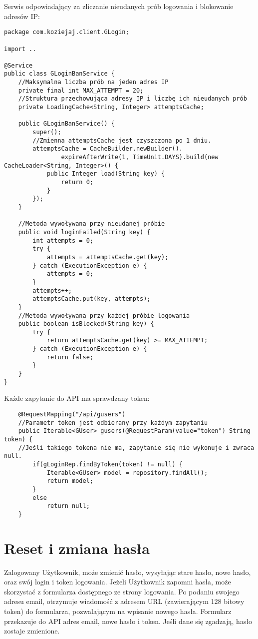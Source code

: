 \documentclass[a4paper,12pt,twoside,openany]{report}
\begin{document}
Serwis odpowiadający za zliczanie nieudanych prób logowania i blokowanie adresów IP:
\begin{lstlisting}
package com.koziejaj.client.GLogin;

import ..

@Service
public class GLoginBanService {
	//Maksymalna liczba prób na jeden adres IP
    private final int MAX_ATTEMPT = 20;
    //Struktura przechowująca adresy IP i liczbę ich nieudanych prób
    private LoadingCache<String, Integer> attemptsCache;

    public GLoginBanService() {
        super();
        //Zmienna attemptsCache jest czyszczona po 1 dniu.
        attemptsCache = CacheBuilder.newBuilder().
                expireAfterWrite(1, TimeUnit.DAYS).build(new CacheLoader<String, Integer>() {
            public Integer load(String key) {
                return 0;
            }
        });
    }
    
	//Metoda wywoływana przy nieudanej próbie
    public void loginFailed(String key) {
        int attempts = 0;
        try {
            attempts = attemptsCache.get(key);
        } catch (ExecutionException e) {
            attempts = 0;
        }
        attempts++;
        attemptsCache.put(key, attempts);
    }
	//Metoda wywoływana przy każdej próbie logowania
    public boolean isBlocked(String key) {
        try {
            return attemptsCache.get(key) >= MAX_ATTEMPT;
        } catch (ExecutionException e) {
            return false;
        }
    }
}

\end{lstlisting}
Każde zapytanie do API ma sprawdzany token:
\begin{lstlisting}
    @RequestMapping("/api/gusers")
    //Parametr token jest odbierany przy każdym zapytaniu
    public Iterable<GUser> gusers(@RequestParam(value="token") String token) {
    //Jeśli takiego tokena nie ma, zapytanie się nie wykonuje i zwraca null.
        if(gLoginRep.findByToken(token) != null) {
            Iterable<GUser> model = repository.findAll();
            return model;
        }
        else
            return null;
    }
\end{lstlisting}
\section{Reset i zmiana hasła}
Zalogowany Użytkownik, może zmienić hasło, wysyłając stare hasło, nowe hasło, oraz swój login i token logowania. Jeżeli Użytkownik zapomni hasła, może skorzystać z formularza dostępnego ze strony logowania. Po podaniu swojego adresu email, otrzymuje wiadomość z adresem URL (zawierającym 128 bitowy token) do formularza, pozwalającym na wpisanie nowego hasła. Formularz przekazuje do API adres email, nowe hasło i token. Jeśli dane się zgadzają, hasło zostaje zmienione.
\end{document}
